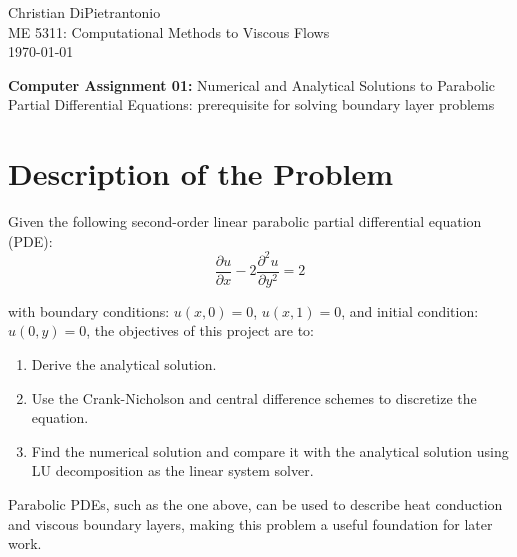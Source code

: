 \documentclass[letterpaper,12pt]{article}
\begin{document}


Christian DiPietrantonio \\
ME 5311: Computational Methods to Viscous Flows \\
\today

\vspace{6pt}


{\large \textbf{Computer Assignment 01:} \normalsize Numerical and Analytical Solutions to Parabolic Partial Differential Equations: prerequisite for solving boundary layer problems}


\section{Description of the Problem}
Given the following second-order linear parabolic partial differential equation (PDE):
\begin{equation}
\frac{\partial u}{\partial x} - 2 \frac{\partial^2 u}{\partial y^2} = 2
\end{equation}

with boundary conditions: $u\left(x,0\right) = 0$, $u\left(x,1\right) = 0$, and initial condition: $u(0,y) = 0$, the objectives of this project are to:
\begin{enumerate}
    \item Derive the analytical solution.
    \item Use the Crank-Nicholson and central difference schemes to discretize the equation.
    \item Find the numerical solution and compare it with the analytical solution using LU decomposition as the linear system solver.
\end{enumerate}

Parabolic PDEs, such as the one above, can be used to describe heat conduction and viscous boundary layers, making this problem a useful foundation for later work.

\end{document}
